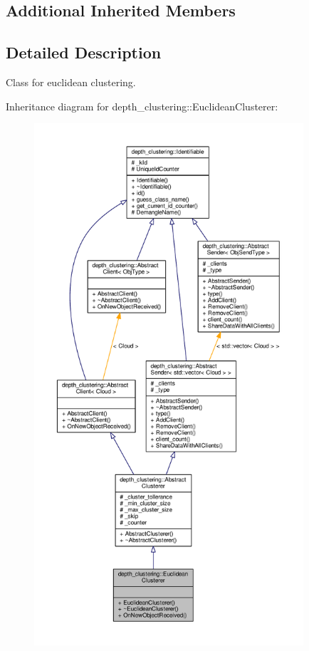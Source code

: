 \subsection*{Additional Inherited Members}


\subsection{Detailed Description}
Class for euclidean clustering. 

Inheritance diagram for depth\-\_\-clustering\-:\-:Euclidean\-Clusterer\-:
\nopagebreak
\begin{figure}[H]
\begin{center}
\leavevmode
\includegraphics[height=550pt]{classdepth__clustering_1_1EuclideanClusterer__inherit__graph}
\end{center}
\end{figure}


